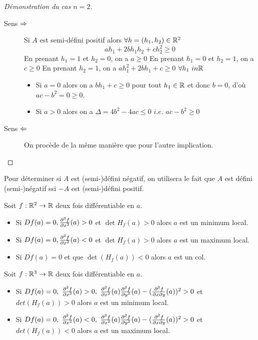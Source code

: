 \begin{proof}[Démonstration du cas $n = 2$]
\begin{description}
    \item[Sens $\Rightarrow$] Si $A$ est semi-défini positif alors $\forall h = (h_1,h_2) \in \mathbb{R}^2$ $$ ah_1 +2bh_1h_2 + ch_2^2 \ge 0$$
En prenant $h_1 = 1$ et $ h_2 = 0$, on a $a \ge 0$ 
En prenant $h_1 = 0$ et $ h_2 = 1$, on a $c\ge 0$ 
En prenant $ h_2 = 1$, on a $ ah_1^2 + 2bh_1 + c \ge 0$ $\forall h_1 \ in \mathbb{R}$
  \begin{itemize}
      \item Si $a = 0$ alors on a $bh_1 + c\ge 0$ pour tout $h_1\in \mathbb{R}$ et donc $b = 0$, d'où $ac-b^2 = 0\ge 0$.
      \item Si $a>0$ alors on a $\Delta = 4b^2-4ac\le 0 \textit{ i.e. } ac-b^2\ge 0$
  \end{itemize}       
 
  \item[Sens $\Leftarrow$] On procède de la même manière que pour l'autre implication.
\end{description}
\end{proof}
Pour déterminer si $A$ est (semi-)défini négatif, on utilisera le fait que 
$A$ est défini (semi-)négatif ssi $-A$ est (semi-)défini positif.
\begin{proposition}
    Soit $f : \mathbb{R}^2 \to \mathbb{R}$ deux fois différentiable en $a$.
    \begin{itemize}
        \item Si $Df(a) = 0, \frac{\partial ^2f}{\partial x^2}(a)>0$ et $\det H_f(a)>0$ alors $a$ est un minimum local.
        \item Si $Df(a) = 0,  \frac{\partial ^2f}{\partial x^2}(a) < 0$ et $\det H_f(a)>0$ alors $a$ est un maximum local.
        \item Si $Df(a) = 0$ et que $\det(H_f(a))<0$ alors $a$ est un col.
    \end{itemize}
\end{proposition}
\begin{proposition}
    Soit $f : \mathbb{R}^3 \to \mathbb{R}$ deux fois différentiable en $a$. 
    \begin{itemize}
        \item Si $Df(a) = 0,\ \dpart{^2f}{x^2}(a)>0,\ \dpart{^2f}{x^2}(a) \dpart{^2f}{y^2}(a) -(\dpart{^2f}{x\partial y}(a))^2>0$ et $det({H_f}(a)) > 0$ alors $a$ est un minimum local.
        \item Si $Df(a) = 0,\ \dpart{^2f}{x^2}(a)<0,\ \dpart{^2f}{x^2}(a) \dpart{^2f}{y^2}(a) -(\dpart{^2f}{x\partial y}(a))^2>0$ et $det({H_f}(a)) < 0$ alors $a$ est un maximum local.
    \end{itemize}
\end{proposition}
